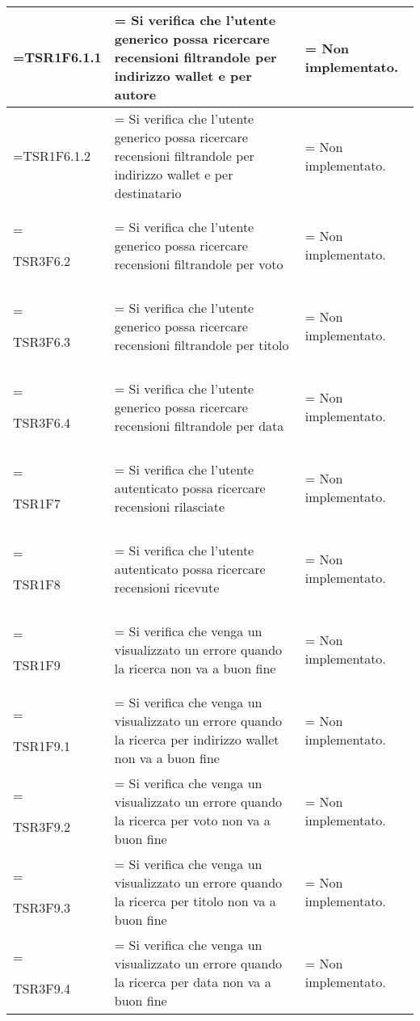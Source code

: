 \begin{xltabular}{\textwidth} {
        >{\hsize\linewidth=\hsize}X
        >{\hsize\linewidth=\hsize}X
        >{\hsize\linewidth=\hsize}X
    }
    TSR1F6.1.1&
    Si verifica che l'utente generico possa ricercare recensioni filtrandole per indirizzo wallet e per autore&
    Non implementato.
    \\ \hline
    
    TSR1F6.1.2&
    Si verifica che l'utente generico possa ricercare recensioni filtrandole per indirizzo wallet e per destinatario&
    Non implementato.
    \\ \hline

    TSR3F6.2&
    Si verifica che l'utente generico possa ricercare recensioni filtrandole per voto&
    Non implementato.
    \\ \hline
    
    TSR3F6.3&
    Si verifica che l'utente generico possa ricercare recensioni filtrandole per titolo&
    Non implementato.
    \\ \hline

    TSR3F6.4&
    Si verifica che l'utente generico possa ricercare recensioni filtrandole per data&
    Non implementato.
    \\ \hline

    TSR1F7&
    Si verifica che l'utente autenticato possa ricercare recensioni rilasciate &
    Non implementato.
    \\ \hline

    TSR1F8&
    Si verifica che l'utente autenticato possa ricercare recensioni ricevute &
    Non implementato.
    \\ \hline
    
    TSR1F9&
    Si verifica che venga un visualizzato un errore quando la ricerca non va a buon fine &
    Non implementato.
    \\ \hline

    TSR1F9.1&
    Si verifica che venga un visualizzato un errore quando la ricerca per indirizzo wallet non va a buon fine &
    Non implementato.
    \\ \hline
    
    TSR3F9.2&
    Si verifica che venga un visualizzato un errore quando la ricerca per voto non va a buon fine &
    Non implementato.
    \\ \hline
    
    TSR3F9.3&
    Si verifica che venga un visualizzato un errore quando la ricerca per titolo non va a buon fine &
    Non implementato.
    \\ \hline

    TSR3F9.4&
    Si verifica che venga un visualizzato un errore quando la ricerca per data non va a buon fine &
    Non implementato.
    \\ \hline


\end{xltabular}
